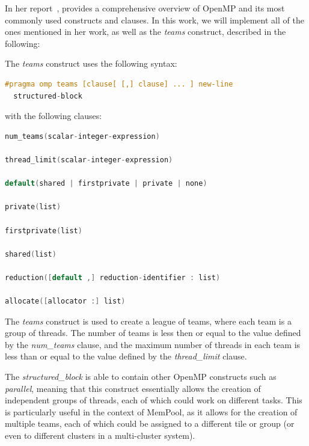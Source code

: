 In her report~\cite{herokmp}, \citeauthor{herokmp} provides a comprehensive overview of OpenMP and
its most commonly used constructs and clauses. In this work, we will implement all of the ones
mentioned in her work, as well as the \emph{teams} construct, described in the following:

The \emph{teams} construct uses the following syntax:

\begin{lstlisting}[language=C, caption={teams construct}, label={lst:teams}]
#pragma omp teams [clause[ [,] clause] ... ] new-line
  structured-block
\end{lstlisting}

with the following clauses:

\begin{lstlisting}[language=C, caption={teams clauses}, label={lst:teams-clauses}]
num_teams(scalar-integer-expression)

thread_limit(scalar-integer-expression)

default(shared | firstprivate | private | none)

private(list)

firstprivate(list)

shared(list)

reduction([default ,] reduction-identifier : list)

allocate([allocator :] list)
\end{lstlisting}

The \emph{teams} construct is used to create a league of teams, where each team is a group of
threads. The number of teams is less then or equal to the value defined by the \emph{num\_teams}
clause, and the maximum number of threads in each team is less than or equal to the value defined by
the \emph{thread\_limit} clause.

The \emph{structured_block} is able to contain other OpenMP constructs such as \emph{parallel},
meaning that this construct essentially allows the creation of independent groups of threads, each
of which could work on different tasks. This is particularly useful in the context of MemPool, as
it allows for the creation of multiple teams, each of which could be assigned to a different tile or
group (or even to different clusters in a multi-cluster system).
